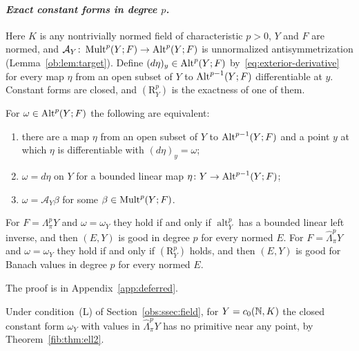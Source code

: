 \paragraph{\textit{Exact constant forms in degree $p$.}}
Here $K$ is any nontrivially normed field of characteristic $p>0$, $Y$ and $F$ are normed, and $\mathcal A_Y\colon\operatorname{Mult}^p(Y;F)\to\operatorname{Alt}^p(Y;F)$ is unnormalized antisymmetrization (Lemma~\ref{ob:lem:target}). Define $(d\eta)_y\in\operatorname{Alt}^p(Y;F)$ by~\eqref{eq:exterior-derivative} for every map $\eta$ from an open subset of $Y$ to $\operatorname{Alt}^{p-1}(Y;F)$ differentiable at $y$. Constant forms are closed, and $(\mathrm R^p_Y)$ is the exactness of one of them.
\begin{proposition}\label{fib:prop:derham}
For $\omega\in\operatorname{Alt}^p(Y;F)$ the following are equivalent:
\begin{enumerate}
\item there are a map $\eta$ from an open subset of $Y$ to $\operatorname{Alt}^{p-1}(Y;F)$ and a point $y$ at which $\eta$ is
differentiable with $(d\eta)_y=\omega$;
\item $\omega=d\eta$ on $Y$ for a bounded linear map $\eta\colon Y\to\operatorname{Alt}^{p-1}(Y;F)$;
\item $\omega=\mathcal A_Y\beta$ for some $\beta\in\operatorname{Mult}^p(Y;F)$.
\end{enumerate}
For $F=\Lambda^p_\pi Y$ and $\omega=\omega_Y$ they hold if and only if $\operatorname{alt}^p_Y$ has a bounded linear left
inverse, and then $(E,Y)$ is good in degree $p$ for every normed $E$. For $F=\widehat\Lambda^p_\pi Y$ and
$\omega=\omega_Y$ they hold if and only if $(\mathrm R^p_Y)$ holds, and then $(E,Y)$ is good for Banach values in degree
$p$ for every normed $E$.
\end{proposition}

The proof is in Appendix~\ref{app:deferred}.

Under condition~\textup{(L)} of Section~\ref{obs:ssec:field}, for $Y=c_0(\mathbb N,K)$ the closed constant form $\omega_Y$ with values in $\widehat\Lambda^p_\pi Y$ has no primitive near any point, by Theorem~\ref{fib:thm:ell2}.
